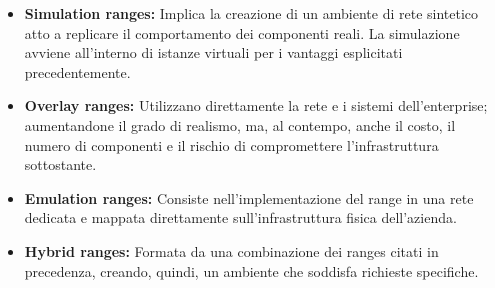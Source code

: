     \begin{itemize}
        \item \textbf{Simulation ranges:} Implica la creazione di un ambiente di rete sintetico atto a replicare il comportamento dei componenti reali. La simulazione avviene all'interno di istanze virtuali per i vantaggi esplicitati precedentemente.
        \item \textbf{Overlay ranges:} Utilizzano direttamente la rete e i sistemi dell'enterprise; aumentandone il grado di realismo, ma, al contempo, anche il costo, il numero di componenti e il rischio di compromettere l'infrastruttura sottostante.
        \item \textbf{Emulation ranges:} Consiste nell'implementazione del range in una rete dedicata e mappata direttamente sull'infrastruttura fisica dell'azienda.
        \item \textbf{Hybrid ranges:} Formata da una combinazione dei ranges citati in precedenza, creando, quindi, un ambiente che soddisfa richieste specifiche.
    \end{itemize}
    